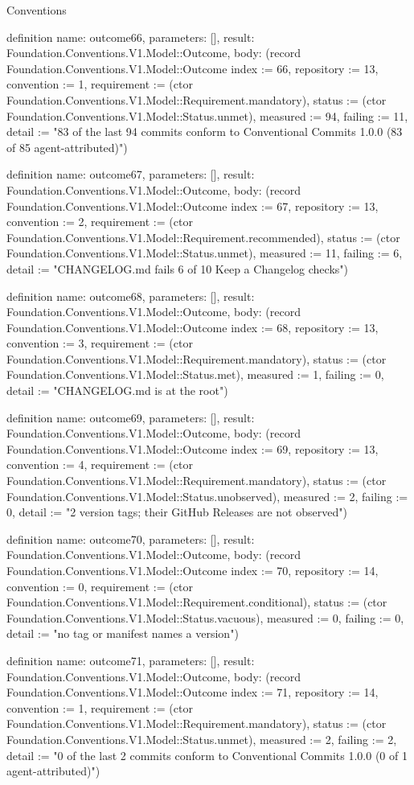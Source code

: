 \begin{lexlean}{Conventions}
\begin{semanticmodule}
definition{
  name: outcome66,
  parameters: [],
  result: Foundation.Conventions.V1.Model::Outcome,
  body: (record Foundation.Conventions.V1.Model::Outcome {index := 66, repository := 13, convention := 1, requirement := (ctor Foundation.Conventions.V1.Model::Requirement.mandatory), status := (ctor Foundation.Conventions.V1.Model::Status.unmet), measured := 94, failing := 11, detail := "83 of the last 94 commits conform to Conventional Commits 1.0.0 (83 of 85 agent-attributed)"})
}

definition{
  name: outcome67,
  parameters: [],
  result: Foundation.Conventions.V1.Model::Outcome,
  body: (record Foundation.Conventions.V1.Model::Outcome {index := 67, repository := 13, convention := 2, requirement := (ctor Foundation.Conventions.V1.Model::Requirement.recommended), status := (ctor Foundation.Conventions.V1.Model::Status.unmet), measured := 11, failing := 6, detail := "CHANGELOG.md fails 6 of 10 Keep a Changelog checks"})
}

definition{
  name: outcome68,
  parameters: [],
  result: Foundation.Conventions.V1.Model::Outcome,
  body: (record Foundation.Conventions.V1.Model::Outcome {index := 68, repository := 13, convention := 3, requirement := (ctor Foundation.Conventions.V1.Model::Requirement.mandatory), status := (ctor Foundation.Conventions.V1.Model::Status.met), measured := 1, failing := 0, detail := "CHANGELOG.md is at the root"})
}

definition{
  name: outcome69,
  parameters: [],
  result: Foundation.Conventions.V1.Model::Outcome,
  body: (record Foundation.Conventions.V1.Model::Outcome {index := 69, repository := 13, convention := 4, requirement := (ctor Foundation.Conventions.V1.Model::Requirement.mandatory), status := (ctor Foundation.Conventions.V1.Model::Status.unobserved), measured := 2, failing := 0, detail := "2 version tags; their GitHub Releases are not observed"})
}

definition{
  name: outcome70,
  parameters: [],
  result: Foundation.Conventions.V1.Model::Outcome,
  body: (record Foundation.Conventions.V1.Model::Outcome {index := 70, repository := 14, convention := 0, requirement := (ctor Foundation.Conventions.V1.Model::Requirement.conditional), status := (ctor Foundation.Conventions.V1.Model::Status.vacuous), measured := 0, failing := 0, detail := "no tag or manifest names a version"})
}

definition{
  name: outcome71,
  parameters: [],
  result: Foundation.Conventions.V1.Model::Outcome,
  body: (record Foundation.Conventions.V1.Model::Outcome {index := 71, repository := 14, convention := 1, requirement := (ctor Foundation.Conventions.V1.Model::Requirement.mandatory), status := (ctor Foundation.Conventions.V1.Model::Status.unmet), measured := 2, failing := 2, detail := "0 of the last 2 commits conform to Conventional Commits 1.0.0 (0 of 1 agent-attributed)"})
}


\end{semanticmodule}
\end{lexlean}
